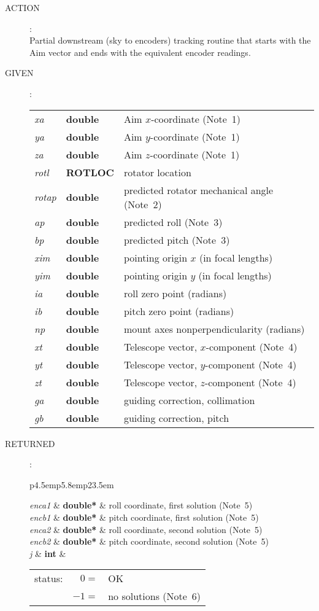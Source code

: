 \documentclass[12pt,fleqn,twoside]{article}
\renewcommand{\_}{{\tt\char'137}}     %
\newcommand{\action}[1]
{
  \goodbreak
  \begin{description}
    \item[ACTION]: \\[0.5ex] \nopagebreak
        #1
  \end{description}
  \vspace{-3ex}
}
\newcommand{\args}[2]
{
  \goodbreak
  \begin{description}
  \item[#1]: \\[1.5ex] \nopagebreak
    \hspace*{-0.9em}
    \begin{tabular}{p{4.5em}p{5.8em}p{23.5em}}
      #2
    \end{tabular}
  \end{description}
  \vspace{-3ex}
}
\newcommand{\spec}[3]
{
  {\em {#1}} & {\bf \mbox{#2}} & {#3}
}
\begin{document}
\action{Partial downstream (sky to encoders) tracking routine
        that starts with the {\sc Aim} vector and ends with the
        equivalent encoder readings.}
\args{GIVEN}
{
\spec{xa}{double}{{\sc Aim} $x$-coordinate (Note~1)}\\
\spec{ya}{double}{{\sc Aim} $y$-coordinate (Note~1)}\\
\spec{za}{double}{{\sc Aim} $z$-coordinate (Note~1)}\\
\spec{rotl}{ROTLOC}{rotator location} \\
\spec{rotap}{double}{predicted rotator mechanical angle (Note~2)} \\
\spec{ap}{double}{predicted roll (Note~3)} \\
\spec{bp}{double}{predicted pitch (Note~3)} \\
\spec{xim}{double}{pointing origin $x$ (in focal lengths)} \\
\spec{yim}{double}{pointing origin $y$ (in focal lengths)} \\
\spec{ia}{double}{roll zero point (radians)} \\
\spec{ib}{double}{pitch zero point (radians)} \\
\spec{np}{double}{mount axes nonperpendicularity (radians)} \\
\spec{xt}{double}{{\sc Telescope} vector, $x$-component (Note~4)} \\
\spec{yt}{double}{{\sc Telescope} vector, $y$-component (Note~4)} \\
\spec{zt}{double}{{\sc Telescope} vector, $z$-component (Note~4)} \\
\spec{ga}{double}{guiding correction, collimation} \\
\spec{gb}{double}{guiding correction, pitch}
}
\args{RETURNED}
{
\spec{enca1}{double*}{roll coordinate, first solution (Note~5)} \\
\spec{encb1}{double*}{pitch coordinate, first solution (Note~5)} \\
\spec{enca2}{double*}{roll coordinate, second solution (Note~5)} \\
\spec{encb2}{double*}{pitch coordinate, second solution (Note~5)} \\
\spec{j}{int}{\hspace{-1.8ex}
             \begin{tabular}[t]{lrl}
                status: & $  0 = $ & OK \\
                        & $ -1 = $ & no solutions (Note~6) \\
             \end{tabular}
             }
}
\end{document}
